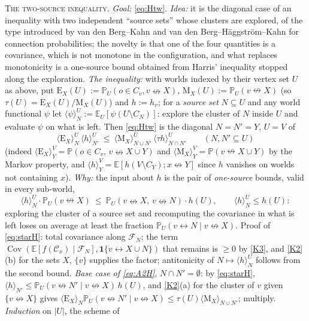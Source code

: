 \documentclass[11pt]{article}
\theoremstyle{definition}
\theoremstyle{remark}
\newcommand{\PP}{\mathbb{P}}
\newcommand{\E}{\mathbb{E}}
\DeclareMathOperator{\Cov}{Cov}
\newcommand{\con}{\leftrightarrow}
\newcommand{\ncon}{\nleftrightarrow}
\newcommand{\one}{\mathbf 1}
\newcommand{\eC}{\mathcal{C}}
\begin{document}
 \textsc{The two-source inequality.}  \emph{Goal:} \eqref{eq:Htw}.  \emph{Idea:} it is the diagonal case of an inequality with two independent
``source sets'' whose clusters are explored, of the type introduced by van den Berg--Kahn and van den Berg--H\"aggstr\"om--Kahn for connection
probabilities; the novelty is that one of the four quantities is a covariance, which is not monotone in the configuration, and what replaces
monotonicity is a one-source bound obtained from Harris' inequality stopped along the exploration.  \emph{The inequality:} with worlds indexed by their vertex set $U$ as above, put
$\mathrm E_X(U):=\PP_U(o\in C_v,v\ncon X)$, $\mathrm M_X(U):=\PP_U(v\ncon X)$ (so $\tau(U)=\mathrm E_X(U)/\mathrm M_X(U)$) and $h:=h_v$; for a \emph{source set}
$N\subseteq U$ and any world functional $\psi$ let $\langle\psi\rangle^U_N:=\E_U[\psi(U\setminus C_N)]$: explore the cluster of $N$ inside $U$ and
evaluate $\psi$ on what is left.  Then \eqref{eq:Htw} is the diagonal $N=N'=Y$, $U=V$ of
\begin{equation}\label{eq:A2H}
 \langle\mathrm E_X\rangle^U_N\,\langle h\rangle^U_{N'}\ \le\ \langle\mathrm M_X\rangle^U_{N\cup N'}\,\langle\tau h\rangle^U_{N\cap N'}\qquad(N,N'\subseteq U)
\end{equation}
(indeed $\langle\mathrm E_X\rangle^V_Y=\PP(o\in C_v,\,v\ncon X\cup Y)$ and $\langle\mathrm M_X\rangle^V_Y=\PP(v\ncon X\cup Y)$ by the Markov property, and
$\langle h\rangle^V_Y=\E[h(V\setminus C_Y);x\ncon Y]$ since $h$ vanishes on worlds not containing $x$).
\emph{Why:} the input about $h$ is the pair of \emph{one-source} bounds, valid in every sub-world,
\begin{equation}\label{eq:starH}
 \langle h\rangle^U_N\cdot\PP_U(v\ncon X)\ \le\ \PP_U(v\ncon X,\,v\ncon N)\cdot h(U),\qquad \langle h\rangle^U_N\le h(U):
\end{equation}
exploring the cluster of a source set and recomputing the covariance in what is left loses on average at least the fraction
$\PP_U(v\con N\mid v\ncon X)$.  Proof of \eqref{eq:starH}: total covariance along $\mathcal F_N$; the term $\Cov(\E[f(\eC_x)\mid\mathcal F_N],\one\{v\con X\cup N\})$
that remains is $\ge0$ by \ref{K3}, and \ref{K2}(b) for the sets $X$, $\{v\}$ supplies the factor; antitonicity of $N\mapsto\langle h\rangle^U_N$ follows
from the second bound.  \emph{Base case of \eqref{eq:A2H}}, $N\cap N'=\emptyset$: by \eqref{eq:starH},
$\langle h\rangle_{N'}\le\PP_U(v\ncon N'\mid v\ncon X)\,h(U)$, and \ref{K2}(a) for the cluster of $v$ given $\{v\ncon X\}$ gives
$\langle\mathrm E_X\rangle_N\PP_U(v\ncon N'\mid v\ncon X)\le\tau(U)\langle\mathrm M_X\rangle_{N\cup N'}$; multiply.  \emph{Induction} on $|U|$, the scheme of
\end{document}
